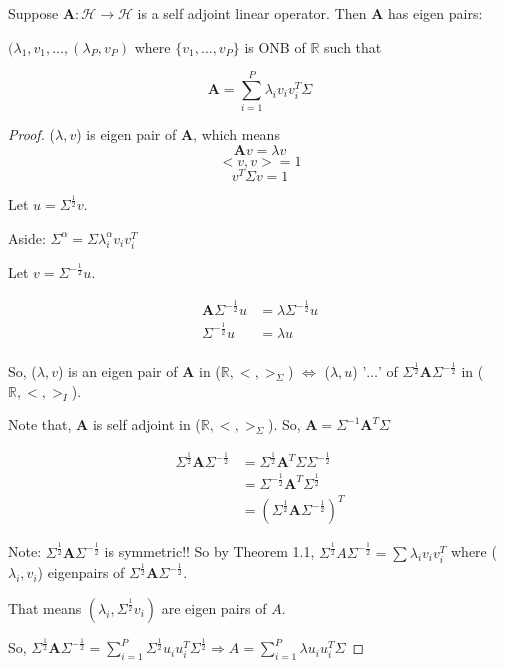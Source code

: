 \documentclass[11pt,fleqn]{book} %
\begin{document}
\begin{theorem}
	Suppose $\bm{A}: \mathscr{H} \rightarrow \mathscr{H}$ is a self adjoint linear operator. Then $\bm{A}$ has eigen pairs:

	$(\lambda_1, v_1, \dots, (\lambda_P, v_P)$ where $\{v_1, \dots, v_P \}$ is ONB of $\mathbb{R}$ such that

	$$\bm{A} = \displaystyle \sum^P_{i=1} \lambda_i v_i v_i^T \Sigma$$



\end{theorem}

\begin{proof}
	($\lambda, v$) is eigen pair of $\bm{A}$, which means
	 	$$\bm{A}v = \lambda v $$
	 	$$<v,v> = 1$$
	 	$$v^T\Sigma v = 1$$

	  Let $u = \Sigma^{\frac{1}{2}} v$. 

\begin{remark}
		Aside: $\Sigma^\alpha = \Sigma \lambda_i^\alpha v_i v_i^T$

\end{remark}


	Let $v = \Sigma^{-\frac{1}{2}} u$.

	\begin{align*}
		\bm{A} \Sigma^{-\frac{1}{2}} u &= \lambda \Sigma^{-\frac{1}{2}} u\\
		\Sigma^{-\frac{1}{2}} u &= \lambda u\\
	\end{align*}

So, ($\lambda, v$) is  an eigen pair of $\bm{A}$ in ($\mathbb{R}, <,>_\Sigma$) $\Leftrightarrow$ ($\lambda, u$) '$\dots$' of $\Sigma^{\frac{1}{2}} \bm{A} \Sigma^{-\frac{1}{2}}$ in ($\mathbb{R}, <,>_I$).

Note that, $\bm{A}$ is self adjoint in ($\mathbb{R}, <,>_\Sigma$). So, $\bm{A} = \Sigma^{-1} \bm{A}^T \Sigma$

\begin{align*}
	\Sigma^{\frac{1}{2}} \bm{A} \Sigma^{- \frac{1}{2}} &= \Sigma^{\frac{1}{2}} \bm{A}^T \Sigma \Sigma^{-\frac{1}{2}}\\
	&= \Sigma^{-\frac{1}{2}} \bm{A}^T \Sigma^{\frac{1}{2}} \\
	&= (\Sigma^{\frac{1}{2}} \bm{A} \Sigma^{-\frac{1}{2}})^T
\end{align*}

Note: $\Sigma^{\frac{1}{2}} \bm{A} \Sigma^{-\frac{1}{2}}$ is symmetric!! So by Theorem 1.1, $\Sigma^{\frac{1}{2}} A \Sigma^{-\frac{1}{2}} = \sum \lambda_i v_i v_i^T$ where ($\lambda_i, v_i$) eigenpairs of $\Sigma^{\frac{1}{2}} \bm{A} \Sigma^{-\frac{1}{2}}$. 

That means $(\lambda_i, \Sigma^{\frac{1}{2}} v_i)$ are eigen pairs of $A$. 

So, $\Sigma^{\frac{1}{2}} \bm{A} \Sigma^{-\frac{1}{2}} = \displaystyle \sum ^P_{i=1} \Sigma^{\frac{1}{2}} u_i u_i^T \Sigma^{\frac{1}{2}} \Rightarrow A = \displaystyle \sum ^P_{i=1} \lambda u_i u_i^T \Sigma$ 
\end{proof}
\end{document}
